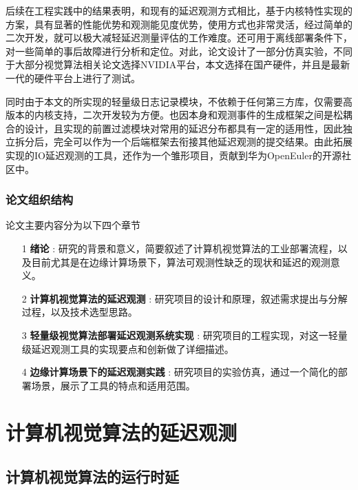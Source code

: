 \documentclass[master]{shtthesis}
\begin{document}
后续在工程实践中的结果表明，和现有的延迟观测方式相比，基于内核特性实现的方案，具有显著的性能优势和观测能见度优势，使用方式也非常灵活，经过简单的二次开发，就可以极大减轻延迟测量评估的工作难度。还可用于离线部署条件下，对一些简单的事后故障进行分析和定位。对此，论文设计了一部分仿真实验，不同于大部分视觉算法相关论文选择NVIDIA平台，本文选择在国产硬件，并且是最新一代的硬件平台上进行了测试。

同时由于本文的所实现的轻量级日志记录模块，不依赖于任何第三方库，仅需要高版本的内核支持，二次开发较为方便。也因本身和观测事件的生成框架之间是松耦合的设计，且实现的前置过滤模块对常用的延迟分布都具有一定的适用性，因此独立拆分后，完全可以作为一个后端框架去衔接其他延迟观测的提交结果。由此拓展实现的IO延迟观测的工具，还作为一个雏形项目，贡献到华为OpenEuler的开源社区中\cite{stortrace}。

\subsection{论文组织结构}\label{论文组织结构}
论文主要内容分为以下四个章节
\begin{itemize}
	\item[1]\textbf{绪论} : 研究的背景和意义，简要叙述了计算机视觉算法的工业部署流程，以及目前尤其是在边缘计算场景下，算法可观测性缺乏的现状和延迟的观测意义。
	\item[2]\textbf{计算机视觉算法的延迟观测} : 研究项目的设计和原理，叙述需求提出与分解过程，以及技术选型思路。
	\item[3]\textbf{轻量级视觉算法部署延迟观测系统实现} : 研究项目的工程实现，对这一轻量级延迟观测工具的实现要点和创新做了详细描述。
	\item[4]\textbf{边缘计算场景下的延迟观测实践} : 研究项目的实验仿真，通过一个简化的部署场景，展示了工具的特点和适用范围。
\end{itemize}



\chapter{计算机视觉算法的延迟观测}\label{计算机视觉算法的延迟观测}
\section{计算机视觉算法的运行时延}\label{计算机视觉算法的运行时延}
\end{document}
